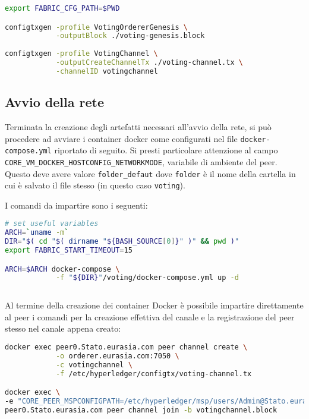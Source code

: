 \begin{lstlisting}[language=bash]
export FABRIC_CFG_PATH=$PWD

configtxgen -profile VotingOrdererGenesis \
			-outputBlock ./voting-genesis.block
			
configtxgen -profile VotingChannel \
			-outputCreateChannelTx ./voting-channel.tx \
			-channelID votingchannel
\end{lstlisting}

	\subsection{Avvio della rete}
		Terminata la creazione degli artefatti necessari all'avvio della rete, si può procedere ad avviare i container docker come configurati nel file \lstinline{docker-compose.yml} riportato di seguito. Si presti particolare attenzione al campo \lstinline{CORE_VM_DOCKER_HOSTCONFIG_NETWORKMODE}, variabile di ambiente del peer. Questo deve avere valore \lstinline{folder_defaut} dove \lstinline{folder} è il nome della cartella in cui è salvato il file stesso (in questo caso \lstinline{voting}).
		
		
		I comandi da impartire sono i seguenti:
		
\begin{lstlisting}[language=bash]
# set useful variables
ARCH=`uname -m`
DIR="$( cd "$( dirname "${BASH_SOURCE[0]}" )" && pwd )"
export FABRIC_START_TIMEOUT=15

ARCH=$ARCH docker-compose \
			-f "${DIR}"/voting/docker-compose.yml up -d
			
\end{lstlisting}

		Al termine della creazione dei container Docker è possibile impartire direttamente al peer i comandi per la creazione effettiva del canale e la registrazione del peer stesso nel canale appena creato:

	
\begin{lstlisting}[language=bash]
docker exec peer0.Stato.eurasia.com peer channel create \
			-o orderer.eurasia.com:7050 \
			-c votingchannel \
			-f /etc/hyperledger/configtx/voting-channel.tx

docker exec \
-e "CORE_PEER_MSPCONFIGPATH=/etc/hyperledger/msp/users/Admin@Stato.eurasia.com/msp" \
peer0.Stato.eurasia.com peer channel join -b votingchannel.block

\end{lstlisting}

